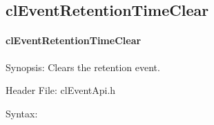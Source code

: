 \begin{flushleft}
\subsection{clEventRetentionTimeClear}
\hypertarget{pageem116}{}\paragraph{cl\-Event\-Retention\-Time\-Clear}\label{pageem116}
\begin{Desc}
\item[Synopsis:]Clears the retention event.\end{Desc}
\begin{Desc}
\item[Header File:]clEventApi.h\end{Desc}
\begin{Desc}
\item[Syntax:]


\end{Desc}
\end{flushleft}
